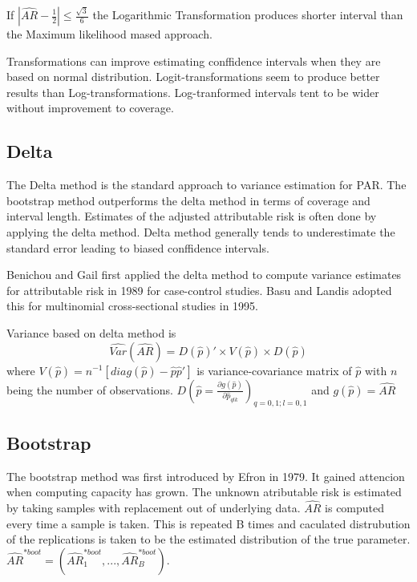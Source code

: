 If $|\hat{AR} - \frac{1}{2}| \leq \frac{\sqrt{3}}{6}$ the Logarithmic Transformation produces shorter interval than the Maximum likelihood mased approach.\cite{Leung1981ComparisonsOC}

Transformations can improve estimating conffidence intervals when they are based on normal distribution. Logit-transformations seem to produce better results than Log-transformations. Log-tranformed intervals tent to be wider without improvement to coverage. \cite{LehnertBatar2006ComparisonOC}

\subsection{Delta}
The Delta method is the standard approach to variance estimation for PAR. The bootstrap method outperforms the delta method in terms of coverage and interval length. \cite{Pirikahu2016BayesianMO} Estimates of the adjusted attributable risk is often done by applying the delta method. Delta method generally tends to underestimate the standard error leading to biased conffidence intervals. 

Benichou and Gail first applied the delta method to compute variance estimates for attributable risk in 1989 for case-control studies. Basu and Landis adopted this for multinomial cross-sectional studies in 1995.\cite{LehnertBatar2006ComparisonOC}

Variance based on delta method is 
\begin{equation}
    \hat{Var}(\hat{AR}) = D(\hat{p})' \times V(\hat{p}) \times D(\hat{p})
\end{equation} where $V(\hat{p}) = n^{-1}[diag(\hat{p})-\hat{p}\hat{p}']$ is variance-covariance matrix of $\hat{p}$ with $n$ being the number of observations. $D(\hat{p} = \frac{\partial g(\hat{p})}{\partial \hat{p}_{qlk}})_{q=0,1;l=0,1}$ and $g(\hat{p}) = \hat{AR}$\cite{LehnertBatar2006ComparisonOC}

\subsection{Bootstrap}
The bootstrap method was first  introduced by Efron in 1979. It gained attencion when computing capacity has grown. The unknown atributable risk is estimated by taking samples with replacement out of underlying data. $\hat{AR}$ is computed every time a sample is taken. This is repeated B times and caculated distrubution of the replications is taken to be the estimated distribution of the true parameter. $\hat{AR}^{*boot} = (\hat{AR}_1^{*boot}, ..., \hat{AR}_B^{*boot})$. \cite{LehnertBatar2006ComparisonOC}

